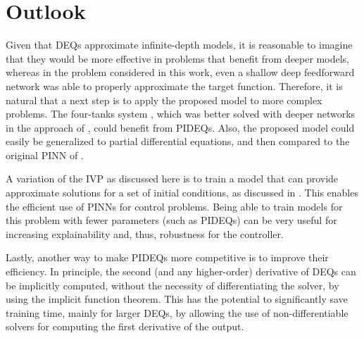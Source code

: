 
\section{Outlook}

Given that \gls{DEQ}s approximate infinite-depth models, it is reasonable to imagine that they would be more effective in problems that benefit from deeper models, whereas in the problem considered in this work, even a shallow deep feedforward network was able to properly approximate the target function.
Therefore, it is natural that a next step is to apply the proposed model to more complex problems.
The four-tanks system \cite{johansson_quadruple-tank_2000,gatzke_model_2000}, which was better solved with deeper networks in the approach of \textcite{Antonelo2021}, could benefit from \glspl{PIDEQ}.
Also, the proposed model could easily be generalized to partial differential equations, and then compared to the original \gls{PINN} of \textcite{Raissi2019}.

A variation of the \gls{IVP} as discussed here is to train a model that can provide approximate solutions for a set of initial conditions, as discussed in \textcite{Antonelo2021,Arnold2021}.
This enables the efficient use of \glspl{PINN} for control problems.
Being able to train models for this problem with fewer parameters (such as \glspl{PIDEQ}) can be very useful for increasing explainability and, thus, robustness for the controller.

Lastly, another way to make \glspl{PIDEQ} more competitive is to improve their efficiency.
In principle, the second (and any higher-order) derivative of \glspl{DEQ} can be implicitly computed, without the necessity of differentiating the solver, by using the implicit function theorem.
This has the potential to significantly save training time, mainly for larger \glspl{DEQ}, by allowing the use of non-differentiable solvers for computing the first derivative of the output.

